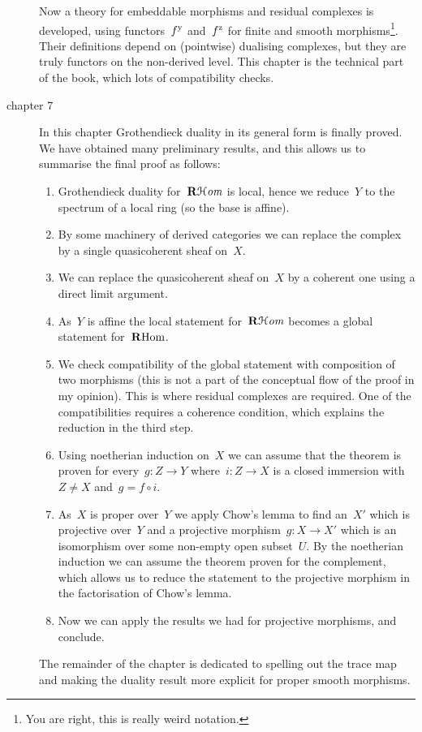 \documentclass[10pt,a4paper]{article}
\begin{document}
\begin{description}
    Now a theory for embeddable morphisms and residual complexes is developed, using functors~$f^{\mathrm{y}}$ and~$f^{\mathrm{z}}$ for finite and smooth morphisms\footnote{You are right, this is really weird notation.}. Their definitions depend on (pointwise) dualising complexes, but they are truly functors on the non-derived level. This chapter is the technical part of the book, which lots of compatibility checks.

  \item[chapter 7] In this chapter Grothendieck duality in its general form is finally proved. We have obtained many preliminary results, and this allows us to summarise the final proof \cite[theorem VII.3.3]{hartshorne-residues-and-duality} as follows:
    \begin{enumerate}
      \item Grothendieck duality for~$\operatorname{\mathbf{R}\mathcal{H}\mathit{om}}$ is local, hence we reduce~$Y$ to the spectrum of a local ring (so the base is affine).
      \item By some machinery of derived categories we can replace the complex by a single quasicoherent sheaf on~$X$.
      \item We can replace the quasicoherent sheaf on~$X$ by a coherent one using a direct limit argument.
      \item As~$Y$ is affine the local statement for~$\operatorname{\mathbf{R}\mathcal{H}\mathit{om}}$ becomes a global statement for~$\operatorname{\mathbf{R}Hom}$.
      \item We check compatibility of the global statement with composition of two morphisms (this is not a part of the conceptual flow of the proof in my opinion). This is where residual complexes are required. One of the compatibilities requires a coherence condition, which explains the reduction in the third step.
      \item Using noetherian induction on~$X$ we can assume that the theorem is proven for every~$g\colon Z\to Y$ where~$i\colon Z\to X$ is a closed immersion with~$Z\neq X$ and~$g=f\circ i$.
      \item As~$X$ is proper over~$Y$ we apply Chow's lemma to find an~$X'$ which is projective over~$Y$ and a projective morphism~$g\colon X\to X'$ which is an isomorphism over some non-empty open subset~$U$. By the noetherian induction we can assume the theorem proven for the complement, which allows us to reduce the statement to the projective morphism in the factorisation of Chow's lemma.
      \item Now we can apply the results we had for projective morphisms, and conclude.
    \end{enumerate}
    The remainder of the chapter is dedicated to spelling out the trace map and making the duality result more explicit for proper smooth morphisms.
\end{description}
\end{document}
